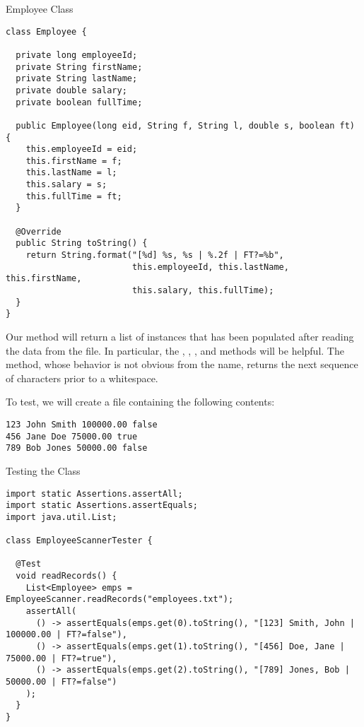 \begin{cl}{Employee Class}
\begin{lstlisting}[language=MyJava]
class Employee {

  private long employeeId;
  private String firstName;
  private String lastName;
  private double salary;
  private boolean fullTime;
  
  public Employee(long eid, String f, String l, double s, boolean ft) {
    this.employeeId = eid;
    this.firstName = f;
    this.lastName = l;
    this.salary = s;
    this.fullTime = ft;
  }

  @Override
  public String toString() {
    return String.format("[%d] %s, %s | %.2f | FT?=%b", 
                         this.employeeId, this.lastName, this.firstName, 
                         this.salary, this.fullTime);
  }
}
\end{lstlisting}
\end{cl}

Our method will return a list of  instances that has been populated after reading the data from the file. In particular, the , , , and  methods will be helpful. The  method, whose behavior is not obvious from the name, returns the next sequence of characters prior to a whitespace. 

To test, we will create a file containing the following contents:

\par{
\begin{verbatim}
123 John Smith 100000.00 false
456 Jane Doe 75000.00 true
789 Bob Jones 50000.00 false
\end{verbatim}
}

\begin{cl}{Testing the  Class}
\begin{lstlisting}[language=MyJava]
import static Assertions.assertAll;
import static Assertions.assertEquals;
import java.util.List;

class EmployeeScannerTester {

  @Test
  void readRecords() {
    List<Employee> emps = EmployeeScanner.readRecords("employees.txt");
    assertAll(
      () -> assertEquals(emps.get(0).toString(), "[123] Smith, John | 100000.00 | FT?=false"),
      () -> assertEquals(emps.get(1).toString(), "[456] Doe, Jane | 75000.00 | FT?=true"),
      () -> assertEquals(emps.get(2).toString(), "[789] Jones, Bob | 50000.00 | FT?=false")
    );
  }
}
\end{lstlisting}
\end{cl}

